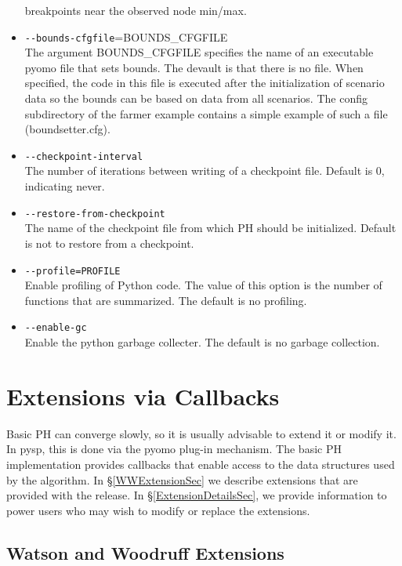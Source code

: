 \begin{itemize}
                        breakpoints near the observed node min/max.
  \item \verb|--bounds-cfgfile|=BOUNDS\_CFGFILE\\
                  The argument BOUNDS\_CFGFILE specifies the name of an executable pyomo file that sets bounds. The devault is that there is no file.
                  When specified, the code in this file is executed after the initialization of scenario data so the
                  bounds can be based on data from all scenarios. The config subdirectory of the farmer example contains a simple example of
                  such a file (boundsetter.cfg).
  \item \verb|--checkpoint-interval|\\
                  The number of iterations between writing of a checkpoint file. Default is 0, indicating never.
  \item \verb|--restore-from-checkpoint|\\
                  The name of the checkpoint file from which PH should be initialized. Default is not to restore from a checkpoint.
  \item \verb|--profile=PROFILE|\\     Enable profiling of Python code.  The value of this option is the number of functions that are summarized. The default is no profiling.
  \item \verb|--enable-gc|\\           Enable the python garbage collecter. The default is no garbage collection.
\end{itemize}

\section{Extensions via Callbacks \label{CallbackSec}}

Basic PH can converge slowly, so it is usually advisable to extend it or modify it. In pysp, this is done via the pyomo plug-in
mechanism. The basic PH implementation provides callbacks that enable access to the data structures used by the algorithm. 
In \S\ref{WWExtensionSec} we describe extensions that are provided with the release. In \S\ref{ExtensionDetailsSec},
we provide information to power users who may wish to modify or replace the extensions.

\subsection{Watson and Woodruff Extensions \label{WWExtensionSec}}


